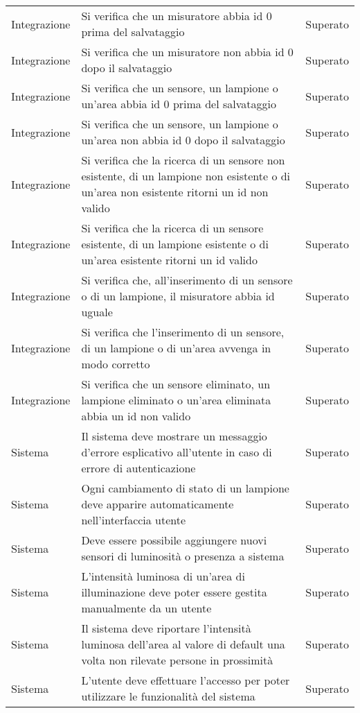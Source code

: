 \begin{center}
\begin{xltabular}{\linewidth}{|l|X|l|}
        \hline
        Integrazione & Si verifica che un misuratore abbia id 0 prima del salvataggio & Superato\\
        Integrazione & Si verifica che un misuratore non abbia id 0 dopo il salvataggio & Superato\\
        Integrazione & Si verifica che un sensore, un lampione o un'area abbia id 0 prima del salvataggio & Superato\\
        Integrazione & Si verifica che un sensore, un lampione o un'area non abbia id 0 dopo il salvataggio & Superato\\
        Integrazione & Si verifica che la ricerca di un sensore non esistente, di un lampione non esistente o di un'area non esistente ritorni un id non valido & Superato\\
        Integrazione & Si verifica che la ricerca di un sensore esistente, di un lampione esistente o di un'area esistente ritorni un id valido & Superato\\
        Integrazione & Si verifica che, all'inserimento di un sensore o di un lampione, il misuratore abbia id uguale & Superato\\
        Integrazione & Si verifica che l'inserimento di un sensore, di un lampione o di un'area avvenga in modo corretto & Superato\\
        Integrazione & Si verifica che un sensore eliminato, un lampione eliminato o un'area eliminata abbia un id non valido & Superato\\
        \hline
        Sistema & Il sistema deve mostrare un messaggio d'errore esplicativo all'utente in caso di errore di autenticazione & Superato\\
        Sistema & Ogni cambiamento di stato di un lampione deve apparire automaticamente nell'interfaccia utente & Superato\\
        Sistema & Deve essere possibile aggiungere nuovi sensori di luminosità o presenza a sistema & Superato\\
        Sistema & L'intensità luminosa di un'area di illuminazione deve poter essere gestita manualmente da un utente & Superato\\
        Sistema & Il sistema deve riportare l'intensità luminosa dell'area al valore di default una volta non rilevate persone in prossimità & Superato\\
        Sistema & L'utente deve effettuare l'accesso per poter utilizzare le funzionalità del sistema & Superato\\

\end{xltabular}
\end{center}
